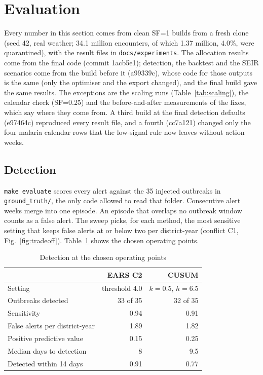 \section{Evaluation}\label{sec:eval}
Every number in this section comes from clean SF=1 builds from a fresh clone (seed 42, real weather; 34.1
million encounters, of which 1.37 million, 4.0\%, were quarantined), with the result files in
\texttt{docs/experiments}. The allocation results come from the final code (commit 1acb5e1); detection, the
backtest and the SEIR scenarios come from the build before it (a99339c), whose code for those outputs is the
same (only the optimiser and the export changed), and the final build gave the same results. The exceptions are the scaling runs
(Table~\ref{tab:scaling}), the calendar check (SF=0.25) and the before-and-after measurements of the fixes,
which say where they come from. A third build at the final detection defaults (e97464c) reproduced every result
file, and a fourth (cc7a121) changed only the four malaria calendar rows that the low-signal rule now leaves
without action weeks.

\subsection{Detection}
\texttt{make evaluate} scores every alert against the 35 injected outbreaks in \texttt{ground\_truth/}, the only
code allowed to read that folder. Consecutive alert weeks merge into one episode. An episode that overlaps no
outbreak window counts as a false alert. The sweep picks, for each method, the most sensitive setting that keeps
false alerts at or below two per district-year (conflict C1, Fig.~\ref{fig:tradeoff}). Table~\ref{tab:detection}
shows the chosen operating points.



\begin{table}[htbp]
\caption{Detection at the chosen operating points}
\label{tab:detection}
\centering\small
\setlength{\tabcolsep}{4pt}
\begin{tabular}{@{}lrr@{}}
\toprule
 & EARS C2 & CUSUM \\
\midrule
Setting & threshold 4.0 & $k=0.5$, $h=6.5$ \\
Outbreaks detected & 33 of 35 & 32 of 35 \\
Sensitivity & 0.94 & 0.91 \\
False alerts per district-year & 1.89 & 1.82 \\
Positive predictive value & 0.15 & 0.25 \\
Median days to detection & 8 & 9.5 \\
Detected within 14 days & 0.91 & 0.77 \\
\bottomrule
\end{tabular}
\end{table}

